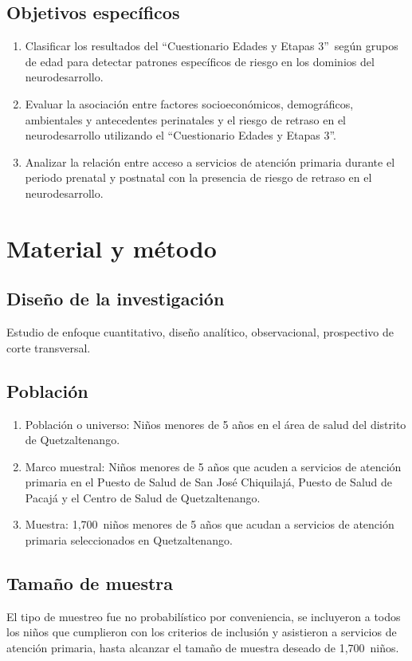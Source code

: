 \documentclass[11pt,letterpaper]{report}
\newcommand{\tiempito}{durante 2,025}
\newcommand{\muestradeseada}{1,700}
\newcommand{\asq}{“Cuestionario Edades y Etapas 3”}
\begin{document}
\section{Objetivos específicos}
	\begin{enumerate}
		\item Clasificar los resultados del \asq\ según grupos de edad para
		detectar patrones específicos de riesgo en los dominios del
		neurodesarrollo.
		
		\item Evaluar la asociación entre factores socioeconómicos,
		demográficos, ambientales y antecedentes perinatales y el riesgo de
		retraso en el neurodesarrollo utilizando el \asq.
		
		\item Analizar la relación entre acceso a servicios de atención
		primaria durante el periodo prenatal y postnatal con la presencia de
		riesgo de retraso en el neurodesarrollo.
	\end{enumerate}

	\chapter{Material y método}
\section{Diseño de la investigación}
Estudio de enfoque cuantitativo, diseño analítico, observacional, prospectivo
de corte transversal.

\section{Población}
	\begin{enumerate}
		\item Población o universo: Niños menores de 5 años en el área de salud
		del distrito de Quetzaltenango.
		\item Marco muestral: Niños menores de 5 años que acuden a servicios de
		atención primaria en el Puesto de Salud de San José Chiquilajá, Puesto
		de Salud de Pacajá y el Centro de Salud de Quetzaltenango. %
		\item Muestra: \muestradeseada\ niños menores de 5 años que acudan a
		servicios de atención primaria seleccionados en Quetzaltenango.
	\end{enumerate}

\section{Tamaño de muestra}
El tipo de muestreo fue no probabilístico por conveniencia, se incluyeron a
todos los niños que cumplieron con los criterios de inclusión y asistieron a
servicios de atención primaria, hasta alcanzar el tamaño de muestra deseado
de \muestradeseada\ niños.
\end{document}
